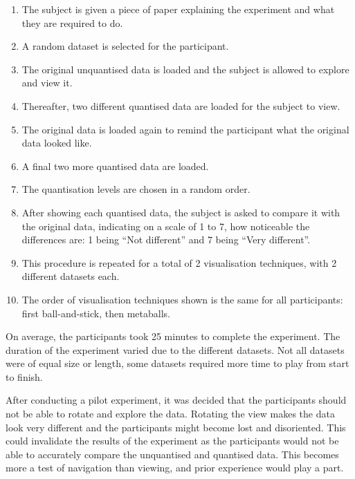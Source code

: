 \begin{enumerate}

  \item The subject is given a piece of paper explaining the experiment and
  what they are required to do.

  \item A random dataset is selected for the participant.

  \item The original unquantised data is loaded and the subject is allowed to
  explore and view it.

  \item Thereafter, two different quantised data are loaded for the subject to
  view.

  \item The original data is loaded again to remind the participant what the
  original data looked like.

  \item A final two more quantised data are loaded.

  \item The quantisation levels are chosen in a random order.

  \item After showing each quantised data, the subject is asked to compare it
  with the original data, indicating on a scale of 1 to 7, how noticeable the
  differences are: 1 being ``Not different'' and 7 being ``Very different''.

  \item This procedure is repeated for a total of 2 visualisation techniques,
  with 2 different datasets each.

  \item The order of visualisation techniques shown is the same for all
  participants: first ball-and-stick, then metaballs.

\end{enumerate}

On average, the participants took 25 minutes to complete the experiment. The
duration of the experiment varied due to the different datasets. Not all
datasets were of equal size or length, some datasets required more time to play
from start to finish.

After conducting a pilot experiment, it was decided that the participants
should not be able to rotate and explore the data. Rotating the view makes the
data look very different and the participants might become lost and
disoriented. This could invalidate the results of the experiment as the
participants would not be able to accurately compare the unquantised and
quantised data. This becomes more a test of navigation than viewing, and prior
experience would play a part.

